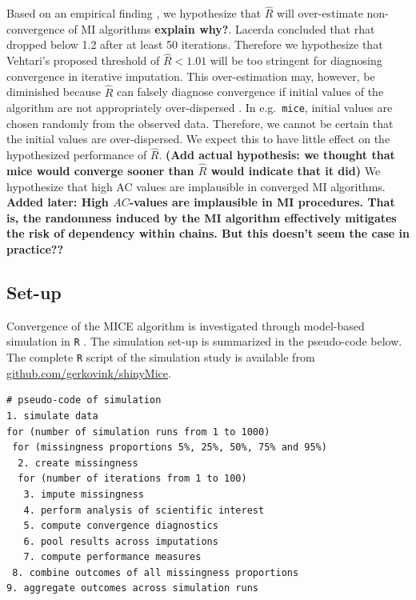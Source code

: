 \documentclass[Royal,times,sageh]{sagej}
\begin{document}
Based on an empirical finding \citep{lace07}, we hypothesize that
\(\widehat{R}\) will over-estimate non-convergence of MI algorithms
\textbf{explain why?}. Lacerda concluded that rhat dropped below 1.2
after at least 50 iterations. Therefore we hypothesize that Vehtari's
proposed threshold of \(\widehat{R} < 1.01\) will be too stringent for
diagnosing convergence in iterative imputation. This over-estimation
may, however, be diminished because \(\widehat{R}\) can falsely diagnose
convergence if initial values of the algorithm are not appropriately
over-dispersed \citep[p.~437]{broo98}. In e.g.~\texttt{mice}, initial
values are chosen randomly from the observed data. Therefore, we cannot
be certain that the initial values are over-dispersed. We expect this to
have little effect on the hypothesized performance of \(\widehat{R}\).
\textbf{(Add actual hypothesis: we thought that mice would converge
sooner than \(\widehat{R}\) would indicate that it did)} We hypothesize
that high AC values are implausible in converged MI algorithms.
\textbf{Added later: High \(AC\)-values are implausible in MI
procedures. That is, the randomness induced by the MI algorithm
effectively mitigates the risk of dependency within chains. But this
doesn't seem the case in practice??}

\hypertarget{set-up}{%
\subsection{Set-up}\label{set-up}}

Convergence of the MICE algorithm is investigated through model-based
simulation in \texttt{R} \citep[version 3.6.3;][]{R}. The simulation
set-up is summarized in the pseudo-code below. The complete \texttt{R}
script of the simulation study is available from
\href{https://github.com/gerkovink/shinyMice/tree/master/3.Thesis/1.SimulationStudy}{github.com/gerkovink/shinyMice}.

\begin{verbatim}
# pseudo-code of simulation 
1. simulate data 
for (number of simulation runs from 1 to 1000)
 for (missingness proportions 5%, 25%, 50%, 75% and 95%)
  2. create missingness
  for (number of iterations from 1 to 100)
   3. impute missingness
   4. perform analysis of scientific interest
   5. compute convergence diagnostics 
   6. pool results across imputations
   7. compute performance measures
 8. combine outcomes of all missingness proportions
9. aggregate outcomes across simulation runs 
\end{verbatim}
\end{document}
